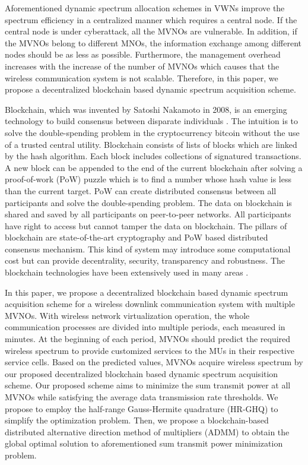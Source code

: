 \documentclass[journal]{IEEEtran}
\begin{document}
Aforementioned dynamic spectrum allocation schemes in VWNs improve the spectrum efficiency in a centralized manner which requires a central node.
If the central node is under cyberattack, all the MVNOs are vulnerable. In addition, if the MVNOs belong to different MNOs, the information exchange among different nodes should be as less as possible. Furthermore, the management overhead increases with the increase of the number of MVNOs which causes that the wireless communication system is not scalable. Therefore, in this paper, we propose a decentralized blockchain based dynamic spectrum acquisition scheme.

Blockchain, which was invented by Satoshi Nakamoto in 2008, is an emerging technology to build consensus between disparate individuals \cite{SNakamoto}. The intuition is to solve the double-spending problem in the cryptocurrency bitcoin without the use of a trusted central utility. Blockchain consists of lists of blocks which are linked by the hash algorithm. Each block includes collections of signatured transactions. A new block can be appended to the end of the current blockchain after solving a proof-of-work (PoW) puzzle which is to find a number whose hash value is less than the current target. PoW can create distributed consensus between all participants and solve the double-spending problem. The data on blockchain is shared and saved by all participants on peer-to-peer networks. All participants have right to access but cannot tamper the data on blockchain. The pillars of blockchain are state-of-the-art cryptography and PoW based distributed consensus mechanism. This kind of system may introduce some computational cost but can provide decentrality, security, transparency and robustness. The blockchain technologies have been extensively used in many areas \cite{KGai,PKSharma,ZXiong,DBRawat,Munsing,KKotobi}.

In this paper, we propose a decentralized blockchain based dynamic spectrum acquisition scheme for a wireless downlink communication system with multiple MVNOs. With wireless network virtualization operation, the whole communication processes are divided into multiple periods, each measured in minutes. At the beginning of each period, MVNOs should predict the required wireless spectrum to provide customized services to the MUs in their respective service cells. Based on the predicted values, MVNOs acquire wireless spectrum by our proposed decentralized blockchain based dynamic spectrum acquisition scheme. Our proposed scheme aims to minimize the sum transmit power at all MVNOs while satisfying the average data transmission rate thresholds. We propose to employ the half-range Gauss-Hermite quadrature (HR-GHQ) to simplify the optimization problem. Then, we propose a blockchain-based distributed alternative direction method of multipliers (ADMM) to obtain the global optimal solution to aforementioned sum transmit power minimization problem.
\end{document}
